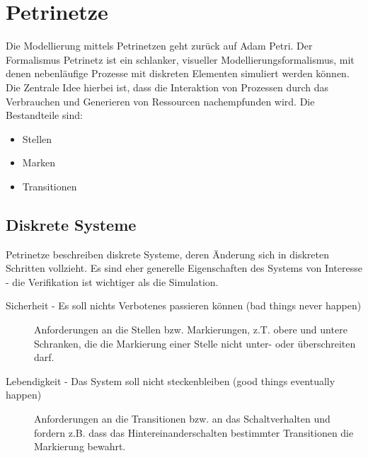 \documentclass[11pt, fleqn, a4paper, leqno]{scrartcl} %
\begin{document}
	
	

\section{Petrinetze}
	Die Modellierung mittels Petrinetzen geht zurück auf Adam Petri. Der Formalismus Petrinetz ist ein schlanker, visueller Modellierungsformalismus, mit denen nebenläufige Prozesse mit diskreten Elementen simuliert werden können. Die Zentrale Idee hierbei ist, dass die Interaktion von Prozessen durch das Verbrauchen und Generieren von Ressourcen nachempfunden wird. Die Bestandteile  sind:
	\begin{itemize}
		\item Stellen
		\item Marken
		\item Transitionen
	\end{itemize}
	\subsection{Diskrete Systeme}
	Petrinetze beschreiben diskrete Systeme, deren Änderung sich in diskreten Schritten vollzieht. Es sind eher generelle Eigenschaften des Systems von Interesse - die Verifikation ist wichtiger als die Simulation.
	\begin{description}
		\item[Sicherheit - Es soll nichts Verbotenes passieren können (bad things never happen)] Anforderungen an die Stellen bzw. Markierungen, z.T. obere und untere Schranken, die die Markierung einer Stelle nicht unter- oder überschreiten darf.
		\item[Lebendigkeit - Das System soll nicht steckenbleiben (good things eventually happen)] Anforderungen an die Transitionen bzw. an das Schaltverhalten und fordern z.B. dass das Hintereinanderschalten bestimmter Transitionen die Markierung bewahrt.
	\end{description}
\end{document}
